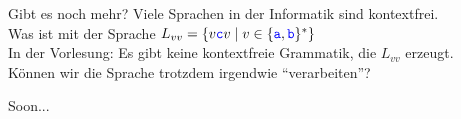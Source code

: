 \begin{frame}{Gibt es noch mehr?}
	Viele Sprachen in der Informatik sind kontextfrei.\\[1em]
	Was ist mit der Sprache $L_{vv} = \{v\hbox{\textcolor{blue}{\texttt{c}}}v \mid v \in \{\hbox{\textcolor{blue}{\texttt{a}}},\hbox{\textcolor{blue}{\texttt{b}}}\}^*\}$\\
	\smallskip
	\pause
	In der Vorlesung: Es gibt keine kontextfreie Grammatik, die $L_{vv}$ erzeugt.\\
	\medskip
	\pause
	Können wir die Sprache trotzdem irgendwie \enquote{verarbeiten}?
	
	\begin{block}{}
		\Large
		\centering
		Soon...\\[1em]
	\end{block}
\end{frame}
